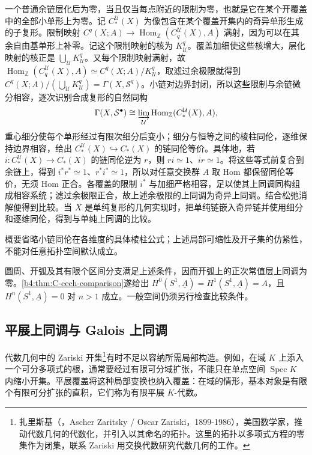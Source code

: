 \begin{proofsketch}
	一个普通余链层化后为零，当且仅当每点附近的限制为零，也就是它在某个开覆盖中的全部小单形上为零。记 \(C_*^{\mathcal U}(X)\) 为像包含在某个覆盖开集内的奇异单形生成的子复形。限制映射 \(C^q(X;A)\to\operatorname{Hom}_{\mathbb Z}(C_q^{\mathcal U}(X),A)\) 满射，因为可以在其余自由基单形上补零。记这个限制映射的核为 \(K_{\mathcal U}^q\)。覆盖加细使这些核增大，层化映射的核正是 \(\bigcup_{\mathcal U}K_{\mathcal U}^q\)。又每个限制映射满射，故 \(\operatorname{Hom}_{\mathbb Z}(C_q^{\mathcal U}(X),A)\simeq C^q(X;A)/K_{\mathcal U}^q\)，取滤过余极限就得到 \(C^q(X;A)/(\bigcup_{\mathcal U}K_{\mathcal U}^q)=\Gamma(X,\mathcal S^q)\)。小链对边界封闭，所以这些限制与余链微分相容，逐次识别合成复形的自然同构
	\[
		\Gamma(X,\mathcal S^\bullet) \cong\varinjlim_{\mathcal U} \operatorname{Hom}_{\mathbb Z}(C_*^{\mathcal U}(X),A),
	\]
	重心细分使每个单形经过有限次细分后变小；细分与恒等之间的棱柱同伦，逐维保持边界相容，给出 \(C_*^{\mathcal U}(X)\hookrightarrow C_*(X)\) 的链同伦等价。具体地，若 \(i:C_*^{\mathcal U}(X)\to C_*(X)\) 的链同伦逆为 \(r\)，则 \(ri\simeq1\)、\(ir\simeq1\)。将这些等式前复合到余链上，得到 \(i^*r^*\simeq1\)、\(r^*i^*\simeq1\)，所以对任意交换群 \(A\) 取 Hom 都保留同伦等价，无须 Hom 正合。各覆盖的限制 \(i^*\) 与加细严格相容，足以使其上同调同构组成相容系统；滤过余极限正合，故上述余极限的上同调为奇异上同调。结合松弛消解便得到比较。当 \(X\) 是单纯复形的几何实现时，把单纯链嵌入奇异链并使用细分和逐维同伦，得到与单纯上同调的比较。

	概要省略小链同伦在各维度的具体棱柱公式；上述局部可缩性及开子集的仿紧性，不能对任意拓扑空间默认成立。
\end{proofsketch}

圆周、开弧及其有限个区间分支满足上述条件，因而开弧上的正次常值层上同调为零。\cref{b4:thm:C-cech-comparison}遂给出 \(H^0(S^1,\underline A)=H^1(S^1,\underline A)=A\)，且 \(H^n(S^1,\underline A)=0\) 对 \(n>1\) 成立。一般空间仍须另行检查比较条件。

\subsection{平展上同调与 Galois 上同调}
\label{b4:subsec:C04:02}

代数几何中的 Zariski 开集\footnote{扎里斯基（，Ascher Zaritsky / Oscar Zariski，1899-1986），美国数学家，推动代数几何的代数化，并引入以其命名的拓扑。这里的拓扑以多项式方程的零集作为闭集，联系 Zariski 用交换代数研究代数几何的工作。}有时不足以容纳所需局部构造。例如，在域 \(K\) 上添入一个可分多项式的根，通常要经过有限可分域扩张，不能只在单点空间 \(\operatorname{Spec}K\) 内缩小开集。平展覆盖将这种局部变换也纳入覆盖：在域的情形，基本对象是有限个有限可分扩张的直积，它们称为有限平展 \(K\)-代数。

